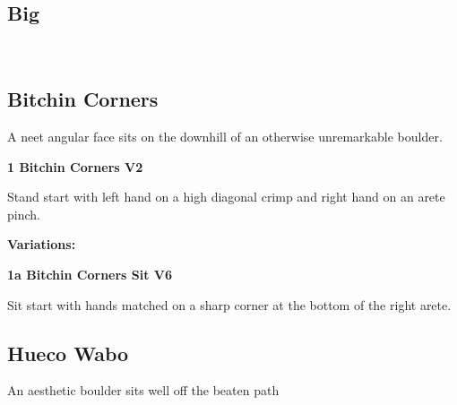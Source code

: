 \begin{multicols}{2}
		\section{Big}\label{sa:Big}
	\begin{minipage}{\columnwidth}
	\
	\end{minipage}

			\subsection*{Bitchin Corners}\label{bf:Bitchin Corners}
			\begin{minipage}{\columnwidth}
			A neet angular face sits on the downhill of an otherwise unremarkable boulder.
			\end{minipage}
			

					\begin{minipage}{\linewidth}	
					\label{rt:Bitchin Corners}
\colorbox{green!20}{
\textbf{
1 Bitchin Corners V2   
}
}

					\begin{adjustwidth}{0.5cm}{}				
					Stand start with left hand on a high diagonal crimp and right hand on an arete pinch.
					\end{adjustwidth}
					\end{minipage}
						\begin{adjustwidth}{0.5cm}{}				
						\textbf{Variations:} \newline
							\begin{minipage}{\linewidth}	
							\label{vr:Bitchin Corners Sit}
\colorbox{RoyalBlue!20}{
\textbf{
1a Bitchin Corners Sit V6    
}
}

							\begin{adjustwidth}{0.5cm}{}				
							Sit start with hands matched on a sharp corner at the bottom of the right arete.
							\end{adjustwidth}
							\end{minipage}
						\end{adjustwidth}
			\subsection*{Hueco Wabo}\label{bf:Hueco Wabo}
			\begin{minipage}{\columnwidth}
			An aesthetic boulder sits well off the beaten path
			\end{minipage}
			

\end{multicols}
